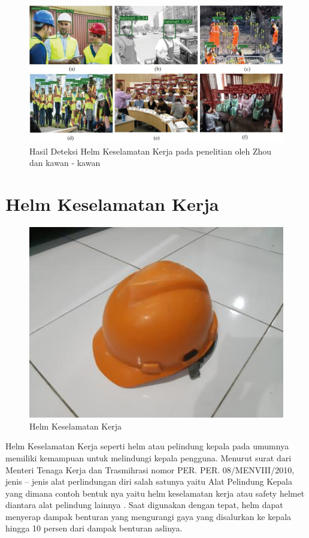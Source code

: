 \begin{figure}[ht]
    \centering
    \includegraphics[scale=0.7]{gambar/zhou_le.jpg}
    \caption{Hasil Deteksi Helm Keselamatan Kerja pada penelitian oleh Zhou dan kawan - kawan}
    \label{fig:zhouimage}  
\end{figure}

\section{Helm Keselamatan Kerja}
\label{sec:helmkeselamatankerja}

\begin{figure}[ht]
    \centering
    \includegraphics[width=1.0\textwidth]{gambar/safety_helmet.jpg}
    \caption{Helm Keselamatan Kerja}
    \label{fig:helmkeselamatankerja}  
\end{figure}

Helm Keselamatan Kerja seperti helm atau pelindung kepala pada umumnya memiliki kemampuan untuk 
melindungi kepala pengguna. Menurut surat dari Menteri Tenaga Kerja dan Trasmihrasi nomor PER. PER. 08/MENVIII/2010, 
jenis – jenis alat perlindungan diri salah satunya yaitu Alat Pelindung Kepala yang dimana contoh bentuk
nya yaitu helm keselamatan kerja atau safety helmet diantara alat pelindung lainnya \cite{suratkementriantenagakerja}. 
Saat digunakan dengan tepat, helm dapat menyerap dampak benturan yang mengurangi gaya yang disalurkan ke kepala hingga 10 persen dari dampak benturan aslinya. \cite{kim2018safety}

